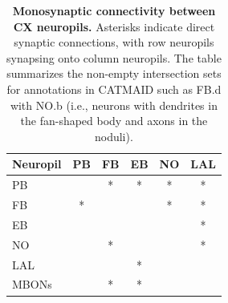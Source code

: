         \begin{table}[H]
        \centering
        \begin{tabular}{l|ccccc}
            \toprule
            Neuropil & PB & FB & EB & NO & LAL \\
            \midrule
            PB &  & * & * & * & * \\
            FB & * & & & * & * \\
            EB & & & & & * \\
            NO & & * & & & * \\
            LAL & & & * & & \\ %
            MBONs &  & * & * & & \\
            \bottomrule
        \end{tabular}
        \caption[Monosynaptic connectivity between CX neuropils]{\textbf{Monosynaptic connectivity between CX neuropils.} Asterisks indicate direct synaptic connections, with row neuropils synapsing onto column neuropils. The table summarizes the non-empty intersection sets for annotations in CATMAID such as FB.d with NO.b (i.e., neurons with dendrites in the fan-shaped body and axons in the noduli).}
        \label{inputsoutputs}
        \end{table}
